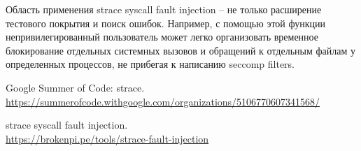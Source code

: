 Область применения strace syscall fault injection -- не только
расширение тестового покрытия и поиск ошибок.  Например, с помощью этой
функции непривилегированный пользователь может легко организовать
временное блокирование отдельных системных вызовов и обращений к
отдельным файлам у определенных процессов, не прибегая к написанию
seccomp filters.


\begin{thebibliography}{9}

 Google Summer of Code: strace. \\
 \url{https://summerofcode.withgoogle.com/organizations/5106770607341568/}

 strace syscall fault injection. \\
 \url{https://brokenpi.pe/tools/strace-fault-injection}

\end{thebibliography}
